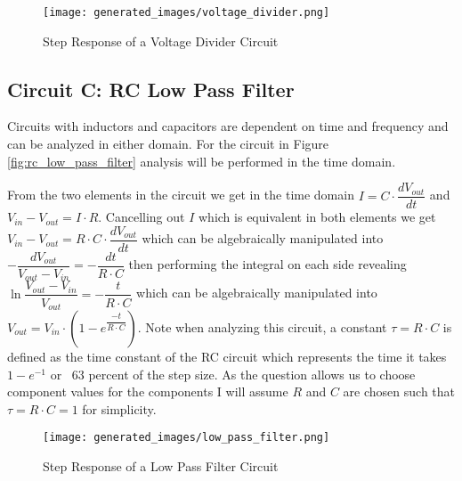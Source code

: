 \documentclass[main.tex]{subfiles}
\begin{document}
\begin{figure}[H]
    \centering
    \texttt{[image: generated\_images/voltage\_divider.png]}
    \caption{Step Response of a Voltage Divider Circuit}
    \label{fig:step-response-voltage-divider}
\end{figure}

\subsection{Circuit C: RC Low Pass Filter}
Circuits with inductors and capacitors are dependent on time and frequency and can be analyzed in either domain. For the circuit in Figure \ref{fig:rc_low_pass_filter} analysis will be performed in the time domain. \newline

\newnoindentpara From the two elements in the circuit we get in the time domain $I = C \cdot \dfrac{dV_{out}}{dt}$ and $V_{in} - V_{out} = I \cdot R$. Cancelling out $I$ which is equivalent in both elements we get $V_{in} - V_{out} = R \cdot C \cdot \dfrac{dV_{out}}{dt}$ which can be algebraically manipulated into $-\dfrac{dV_{out}}{V_{out}-V_{in}} = -\dfrac{dt}{R \cdot C}$ then performing the integral on each side revealing $\ln{\dfrac{V_{out}-V_{in}}{V_{out}}}=-\dfrac{t}{R \cdot C}$ which can be algebraically manipulated into $V_{out}=V_{in} \cdot (1-e^{\dfrac{-t}{R \cdot C}})$. Note when analyzing this circuit, a constant $\tau = R \cdot C$ is defined as the time constant of the RC circuit which represents the time it takes $1-e^{-1}$ or ~63 percent of the step size. As the question allows us to choose component values for the components I will assume $R$ and $C$ are chosen such that $\tau = R \cdot C = 1$ for simplicity.

\begin{figure}[H]
    \centering
    \texttt{[image: generated\_images/low\_pass\_filter.png]}
    \caption{Step Response of a Low Pass Filter Circuit}
    \label{fig:step-response-low-pass-filter}
\end{figure}
\end{document}
